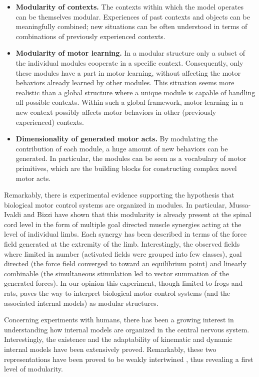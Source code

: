 \documentclass{svmult}
\begin{document}
\begin{itemize}

\item \textbf{Modularity of contexts.} The contexts within which the model operates
can be themselves modular. Experiences of past contexts and objects
can be meaningfully combined; new situations can be often understood
in terms of combinations of previously experienced contexts.

\item \textbf{Modularity of motor learning.} In a modular structure only a subset
of the individual modules cooperate in a specific context.
Consequently, only these modules have a part in motor learning,
without affecting the motor behaviors already learned by other
modules. This situation seems more realistic than a global structure
where a unique module is capable of handling all possible contexts.
Within such a global framework, motor learning in a new context
possibly affects motor behaviors in other (previously experienced)
contexts.

\item \textbf{Dimensionality of generated motor acts.} By modulating 
the contribution of each module, a huge amount of new behaviors can 
be generated. In particular, the modules can be seen as a vocabulary 
of motor primitives, which are the building blocks for constructing 
complex novel motor acts.
 
\end{itemize}

Remarkably, there is experimental evidence supporting the hypothesis
that biological motor control systems are organized in modules. In
particular, Mussa-Ivaldi and Bizzi \cite{BizziMussa-Ivaldi} have shown
that this modularity is already present at the spinal cord level 
in the form of multiple goal directed muscle synergies acting at 
the level of individual limbs. Each synergy has been described 
in terms of the force field generated at the extremity of the limb.
Interestingly, the observed fields where limited in number (activated 
fields were grouped into few classes), goal
directed (the force field converged to toward an
equilibrium point) and  linearly combinable (the simultaneous 
stimulation led to vector summation of the generated forces). In our
opinion this experiment, though limited to frogs and rats, paves the 
way to interpret biological motor control systems (and the 
associated internal models) as modular structures. 


Concerning experiments with humans, there has been a growing interest
in understanding how internal models are organized in the central
nervous system. Interestingly, the existence and the adaptability 
of kinematic \cite{flangan95trajectory} and dynamic internal models 
\cite{Shadmehr} have been extensively proved. Remarkably, these two 
representations have been proved to be weakly intertwined \cite{krakauer99independent},
thus revealing a first level of modularity. 
\end{document}
